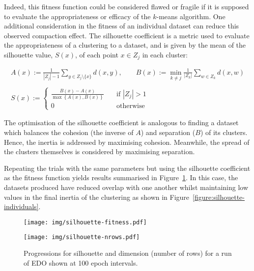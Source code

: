 Indeed, this fitness function could be considered flawed or fragile if it is
supposed to evaluate the appropriateness or efficacy of the \(k\)-means
algorithm. One additional consideration in the fitness of an individual dataset
can reduce this observed compaction effect. The silhouette coefficient is a
metric used to evaluate the appropriateness of a clustering to a dataset, and is
given by the mean of the silhouette value, \(S(x)\), of each point \(x \in Z_j\)
in each cluster:

\begin{equation}
    \begin{gathered}
        A(x) := \frac{1}{|Z_j| - 1} \sum_{y \in Z_j \setminus \{x\}} d(x, y),
        \qquad B(x) := \min_{k \neq j} \frac{1}{|Z_k|} \sum_{w \in Z_k} d(x, w)
        \\\\
        S(x) := 
            \begin{cases}
                \frac{B(x) - A(x)}{\max\left\{A(x), B(x)\right\}}
                &\quad \text{if } |Z_j| > 1\\
                0 &\quad \text{otherwise}
            \end{cases}
    \end{gathered}
\end{equation}

The optimisation of the silhouette coefficient is analogous to finding a dataset
which balances the cohesion (the inverse of \(A\)) and separation (\(B\)) of its
clusters. Hence, the inertia is addressed by maximising cohesion. Meanwhile, the
spread of the clusters themselves is considered by maximising separation.

Repeating the trials with the same parameters but using the silhouette
coefficient as the fitness function yields results summarised in
Figure~\ref{figure:silhouette}. In this case, the datasets produced have reduced
overlap with one another whilst maintaining low values in the final inertia of
the clustering as shown in Figure~\ref{figure:silhouette-individuals}.

\begin{figure}[htbp]
    \centering
    \begin{minipage}{\imgwidth}
        \centering
        \texttt{[image: img/silhouette-fitness.pdf]}
    \end{minipage}

    \begin{minipage}{\imgwidth}
        \centering
        \texttt{[image: img/silhouette-nrows.pdf]}
    \end{minipage}
    \caption{Progressions for silhouette and dimension (number of rows) for a
             run of EDO shown at 100 epoch intervals.}\label{figure:silhouette}
\end{figure}


